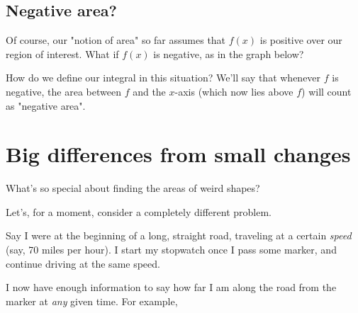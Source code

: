 \documentclass{book}
\begin{document}
\subsection{Negative area?}

Of course, our "notion of area" so far assumes that $f(x)$ is positive over our region of interest. What if $f(x)$ is negative, as in the graph below? 


How do we define our integral in this situation? We'll say that whenever $f$ is negative, the area between $f$ and the $x$-axis (which now lies above $f$) will count as "negative area".







\section{Big differences from small changes}



What's so special about finding the areas of weird shapes?

Let's, for a moment, consider a completely different problem.

Say I were at the beginning of a long, straight road, traveling at a certain \emph{speed} (say, 70 miles per hour). I start my stopwatch once I pass some marker, and continue driving at the same speed.

I now have enough information to say how far I am along the road from the marker at \emph{any} given time. For example, 
\end{document}
